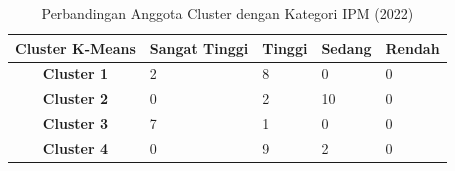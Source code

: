 \begin{table}[H]
\centering
\caption{Perbandingan Anggota Cluster dengan Kategori IPM (2022)} \label{tab:ipm_cross_2022}
\begin{tabular}{|c|p{2cm}|p{2cm}|p{2cm}|p{2cm}|}
\hline
\textbf{Cluster K-Means} & \textbf{Sangat Tinggi} & \textbf{Tinggi} & \textbf{Sedang} & \textbf{Rendah} \\ \hline
\textbf{Cluster 1} & 2 & 8 & 0 & 0 \\ \hline
\textbf{Cluster 2} & 0 & 2 & 10 & 0 \\ \hline
\textbf{Cluster 3} & 7 & 1 & 0 & 0 \\ \hline
\textbf{Cluster 4} & 0 & 9 & 2 & 0 \\ \hline
\end{tabular}
\end{table}